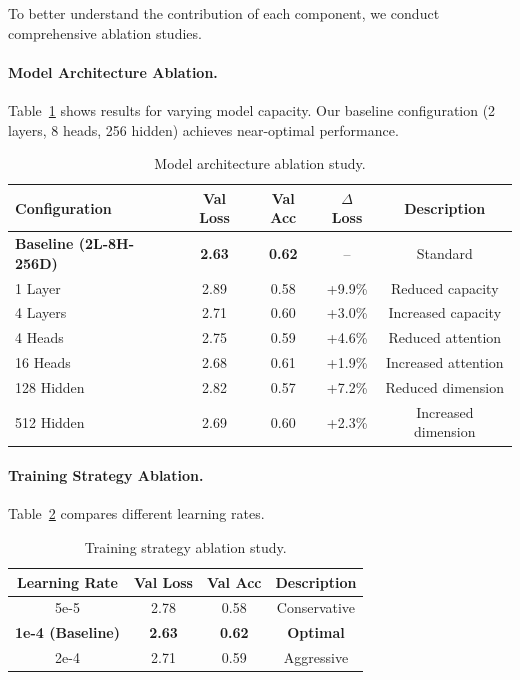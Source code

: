 \documentclass[11pt,a4paper]{article}
\begin{document}
To better understand the contribution of each component, we conduct comprehensive ablation studies.

\paragraph{Model Architecture Ablation.}
Table~\ref{tab:architecture-ablation} shows results for varying model capacity. Our baseline configuration (2 layers, 8 heads, 256 hidden) achieves near-optimal performance.

\begin{table}[t]
\centering
\small
\begin{tabular}{lcccc}
\toprule
\textbf{Configuration} & \textbf{Val Loss} & \textbf{Val Acc} & \textbf{$\Delta$ Loss} & \textbf{Description} \\
\midrule
\textbf{Baseline (2L-8H-256D)} & \textbf{2.63} & \textbf{0.62} & -- & Standard \\
1 Layer & 2.89 & 0.58 & +9.9\% & Reduced capacity \\
4 Layers & 2.71 & 0.60 & +3.0\% & Increased capacity \\
4 Heads & 2.75 & 0.59 & +4.6\% & Reduced attention \\
16 Heads & 2.68 & 0.61 & +1.9\% & Increased attention \\
128 Hidden & 2.82 & 0.57 & +7.2\% & Reduced dimension \\
512 Hidden & 2.69 & 0.60 & +2.3\% & Increased dimension \\
\bottomrule
\end{tabular}
\caption{Model architecture ablation study.}
\label{tab:architecture-ablation}
\end{table}

\paragraph{Training Strategy Ablation.}
Table~\ref{tab:training-ablation} compares different learning rates.

\begin{table}[t]
\centering
\small
\begin{tabular}{cccc}
\toprule
\textbf{Learning Rate} & \textbf{Val Loss} & \textbf{Val Acc} & \textbf{Description} \\
\midrule
5e-5 & 2.78 & 0.58 & Conservative \\
\textbf{1e-4 (Baseline)} & \textbf{2.63} & \textbf{0.62} & \textbf{Optimal} \\
2e-4 & 2.71 & 0.59 & Aggressive \\
\bottomrule
\end{tabular}
\caption{Training strategy ablation study.}
\label{tab:training-ablation}
\end{table}
\end{document}
